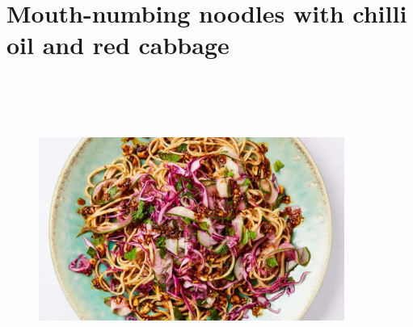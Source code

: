 \documentclass{book}
\begin{document}
\section{Mouth-numbing noodles with chilli oil and red cabbage}
\begin{figure}
\centering\includegraphics[width=10cm,height=10cm,keepaspectratio]{Recipe_Pictures/Mouth-numbing_noodles_with_chilli_oil_and_red_cabbage.png}
\end{figure}
\end{document}

